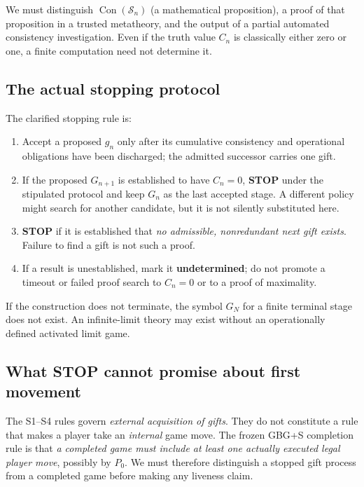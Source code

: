 \documentclass[11pt,letterpaper]{article}
\theoremstyle{definition}\newtheorem{definition}[theorem]{Definition}\newtheorem{example}[theorem]{Example}
\theoremstyle{remark}\newtheorem{remark}[theorem]{Remark}
\newcommand{\Con}{\operatorname{Con}}
\newcommand{\Stage}{\mathcal{S}}
\begin{document}
We must distinguish $\Con(\Stage_n)$ (a mathematical proposition), a proof of that proposition in a trusted metatheory, and the output of a partial automated consistency investigation. Even if the truth value $C_n$ is classically either zero or one, a finite computation need not determine it.

\subsection{The actual stopping protocol}
The clarified stopping rule is:
\begin{enumerate}[label=\textbf{S\arabic*.}]
\item Accept a proposed $g_n$ only after its cumulative consistency and operational obligations have been discharged; the admitted successor carries one gift.
\item If the proposed $G_{n+1}$ is established to have $C_n=0$, \textbf{STOP} under the stipulated protocol and keep $G_n$ as the last accepted stage. A different policy might search for another candidate, but it is not silently substituted here.
\item \textbf{STOP} if it is established that \emph{no admissible, nonredundant next gift exists}. Failure to find a gift is not such a proof.
\item If a result is unestablished, mark it \textbf{undetermined}; do not promote a timeout or failed proof search to $C_n=0$ or to a proof of maximality.
\end{enumerate}
If the construction does not terminate, the symbol $G_N$ for a finite terminal stage does not exist. An infinite-limit theory may exist without an operationally defined activated limit game.

\subsection{What STOP cannot promise about first movement}\label{sec:stop-liveness}
The S1--S4 rules govern \emph{external acquisition of gifts}. They do not
constitute a rule that makes a player take an \emph{internal} game move. The
frozen GBG+S completion rule is that \emph{a completed game must include at
least one actually executed legal player move}, possibly by $P_0$. We must
therefore distinguish a stopped gift process from a completed game before
making any liveness claim.
\end{document}
